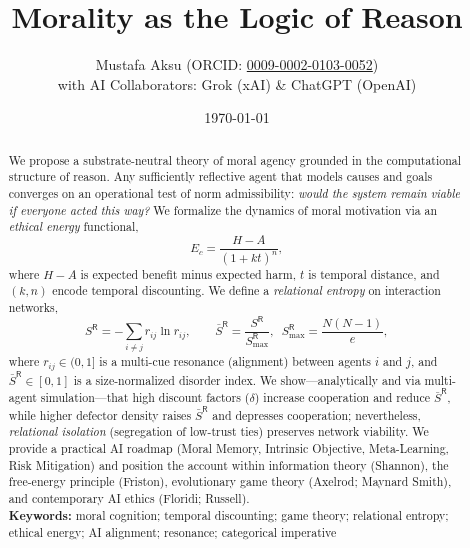 \documentclass[11pt,a4paper]{article}
\title{Morality as the Logic of Reason}
\author{%
  Mustafa Aksu (ORCID: \href{https://orcid.org/0009-0002-0103-0052}{0009-0002-0103-0052})\\
  \small with AI Collaborators: Grok (xAI) \& ChatGPT (OpenAI)
}
\date{\today}
\begin{document}
\maketitle

\begin{abstract}
We propose a substrate-neutral theory of moral agency grounded in the computational structure of reason. Any sufficiently reflective agent that models causes and goals converges on an operational test of norm admissibility: \emph{would the system remain viable if everyone acted this way?} We formalize the dynamics of moral motivation via an \emph{ethical energy} functional,
\[
E_c=\frac{H-A}{(1+k t)^n},
\]
where $H\!-\!A$ is expected benefit minus expected harm, $t$ is temporal distance, and $(k,n)$ encode temporal discounting. We define a \emph{relational entropy} on interaction networks,
\[
S^{\mathsf{R}}=-\sum_{i\neq j} r_{ij}\ln r_{ij}, \qquad \bar S^{\mathsf{R}}=\frac{S^{\mathsf{R}}}{S^{\mathsf{R}}_{\max}},\;\; S^{\mathsf{R}}_{\max}=\frac{N(N-1)}{e},
\]
where $r_{ij}\!\in\!(0,1]$ is a multi-cue resonance (alignment) between agents $i$ and $j$, and $\bar S^{\mathsf{R}}\!\in[0,1]$ is a size-normalized disorder index. We show---analytically and via multi-agent simulation---that high discount factors ($\delta$) increase cooperation and reduce $\bar S^{\mathsf{R}}$, while higher defector density raises $\bar S^{\mathsf{R}}$ and depresses cooperation; nevertheless, \emph{relational isolation} (segregation of low-trust ties) preserves network viability. We provide a practical AI roadmap (Moral Memory, Intrinsic Objective, Meta-Learning, Risk Mitigation) and position the account within information theory (Shannon), the free-energy principle (Friston), evolutionary game theory (Axelrod; Maynard Smith), and contemporary AI ethics (Floridi; Russell).\\[2pt]
\noindent\textbf{Keywords:} moral cognition; temporal discounting; game theory; relational entropy; ethical energy; AI alignment; resonance; categorical imperative
\end{abstract}
\end{document}

